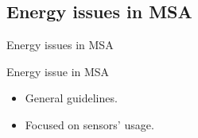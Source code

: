 \subsection{Energy issues in MSA}
\begin{frame}{Energy issues in MSA}
  \begin{block}{Energy issue in MSA }
    \begin{itemize}
      
        \item General guidelines.
        \item Focused on sensors' usage.
    \end{itemize}
  \end{block}
\end{frame}



